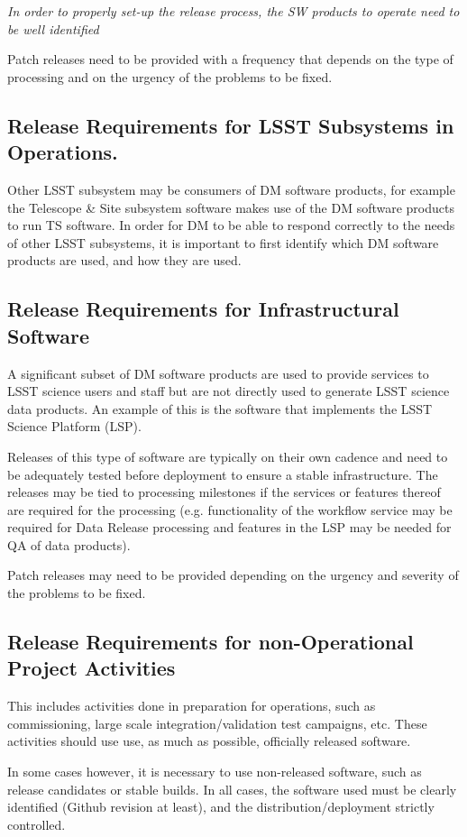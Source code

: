 \textit{In order to properly set-up the release process, the \gls{SW} products to operate need to be well identified}

Patch releases need to be provided with a frequency that depends on the type of processing
and on the urgency of the problems to be fixed.


\subsection{Release Requirements for \gls{LSST} Subsystems in Operations.} \label{sec:otherreqs}

Other \gls{LSST} subsystem may be consumers of \gls{DM} software products, for example the Telescope \& Site subsystem software makes use of the \gls{DM} software products to run  \gls{TS} software. 
In order for \gls{DM} to be able to respond correctly to the needs of other \gls{LSST} subsystems, it is important to first identify which \gls{DM} software products are used, and how they are used.

\subsection{Release Requirements for Infrastructural Software} \label{sec:infreqs}

A significant subset of \gls{DM} software products are used to provide services to \gls{LSST} science users and staff but are not directly used to generate \gls{LSST} science data products. An example of this is the software that implements the \gls{LSST} Science Platform (\gls{LSP}).

Releases of this type of software are typically on their own cadence and need to be adequately tested before deployment to ensure a stable infrastructure. The releases may be tied to processing milestones if the services or features thereof are required for the processing (e.g. functionality of the workflow service may be required for Data Release processing and features in the \gls{LSP} may be needed for \gls{QA} of data products).

Patch releases may need to be provided depending on the urgency and severity of the problems to be fixed.


\subsection{Release Requirements for non-Operational Project Activities} \label{sec:nonopsreqs}

This includes activities done in preparation for operations, such as commissioning, 
large scale integration/validation test campaigns, etc. These activities should use use,  as much as possible,  officially released software.

In some cases however, it is necessary to use non-released software, such as release candidates or stable builds.
In all cases, the software used must be clearly identified (Github revision at least), and the distribution/deployment strictly controlled.

